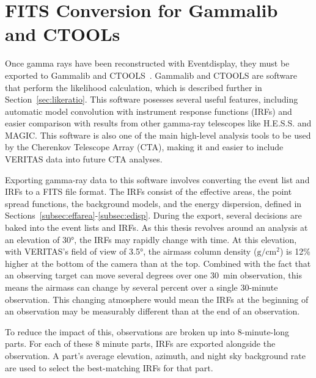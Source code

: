 \section{FITS Conversion for Gammalib and CTOOLs}\label{fitsconversion}
Once gamma rays have been reconstructed with Eventdisplay, they must be exported to Gammalib and CTOOLS~\cite{gammalibctools}.
Gammalib and CTOOLS are software that perform the likelihood calculation, which is described further in Section~\ref{sec:likeratio}.
This software posesses several useful features, including automatic model convolution with instrument response functions (IRFs) and easier comparison with results from other gamma-ray telescopes like H.E.S.S. and MAGIC.
This software is also one of the main high-level analysis tools to be used by the Cherenkov Telescope Array (CTA), making it and easier to include VERITAS data into future CTA analyses.

Exporting gamma-ray data to this software involves converting the event list and IRFs to a FITS file format.
The IRFs consist of the effective areas, the point spread functions, the background models, and the energy dispersion, defined in Sections~\ref{subsec:effarea}-\ref{subsec:edisp}.
During the export, several decisions are baked into the event lists and IRFs.
As this thesis revolves around an analysis at an elevation of \nicetilde{}\ang{30}, the IRFs may rapidly change with time.
At this elevation, with VERITAS's field of view of \ang{3.5}, the airmass column density ($\textrm{g}/\textrm{cm}^2$) is 12\% higher at the bottom of the camera than at the top.
Combined with the fact that an observing target can move several degrees over one \SI{30}{min} observation, this means the airmass can change by several percent over a single 30-minute observation.
This changing atmosphere would mean the IRFs at the beginning of an observation may be measurably different than at the end of an observation.

To reduce the impact of this, observations are broken up into 8-minute-long parts.
For each of these 8 minute parts, IRFs are exported alongside the observation.
A part's average elevation, azimuth, and night sky background rate are used to select the best-matching IRFs for that part.

